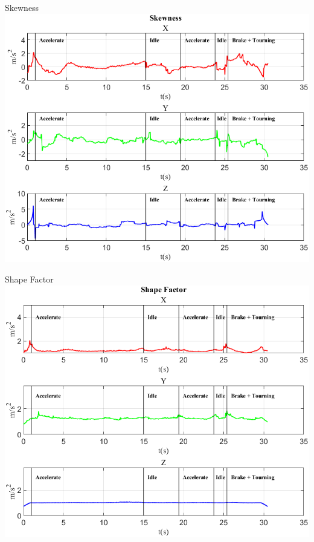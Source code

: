 \documentclass[beamer]{standalone}
\begin{document}
	\begin{frame}{{Skewness}}
		\centering\includegraphics[height=.8\textheight]{figure/Acc/Skewness}
	\end{frame}
	
	\begin{frame}{{Shape Factor}}
			\centering\includegraphics[height=.8\textheight]{figure/Acc/Shape Factor}
	\end{frame}
\end{document}
